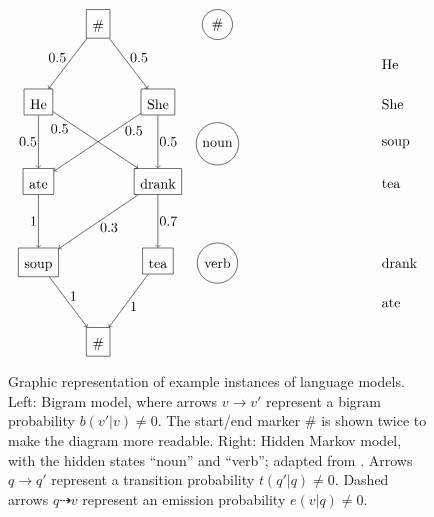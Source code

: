 \begin{figure}[t!]
 \label{fig:language-models}
 \caption{Graphic representation of example instances of language models. Left:
 Bigram model, where arrows $v\to v'$ represent a bigram probability
 $b(v'|v)\neq0$.  The start/end marker $\#$ is shown twice to make the diagram
 more readable. Right: Hidden Markov model, with the hidden states ``noun'' and
 ``verb''; adapted from \cite{nel13}. Arrows $q\to q'$ represent
 a transition probability $t(q'|q)\neq0$. Dashed arrows $q\dashrightarrow v$ represent an
 emission probability $e(v|q)\neq0$.}
 \begin{align*}
  \begin{tikzpicture}[baseline=(current bounding box.north)]
   \begin{scope}[every node/.style={rectangle,draw,text height=1.0em,inner sep=1ex,anchor=north}]
    \node (v0) at (1.5,2) {\#};
    \node (v11) at (0,0) {He};
    \node (v12) at (3,0) {She};
    \node (v21) at (0,-2) {ate};
    \node (v22) at (3,-2) {drank};
    \node (v31) at (0,-4) {soup};
    \node (v32) at (3,-4) {tea};
    \node (v4) at (1.5,-6) {\#};
   \end{scope}
   \begin{scope}[every node/.style={rectangle,inner sep=0.2ex}]
    \draw[->] (v0) -- node[auto,swap] {$0.5$} (v11);
    \draw[->] (v0) -- node[auto] {$0.5$} (v12);
    \draw[->] (v11) -- node[auto,swap] {$0.5$} (v21);
    \draw[->] (v12) -- node[auto,pos=0.2] {$0.5$} (v21);
    \draw[->] (v11) -- node[auto,pos=0.2,swap] {$0.5$} (v22);
    \draw[->] (v12) -- node[auto] {$0.5$} (v22);
    \draw[->] (v21) -- node[auto,swap] {$1$} (v31);
    \draw[->] (v22) -- node[auto] {$0.3$} (v31);
    \draw[->] (v22) -- node[auto] {$0.7$} (v32);
    \draw[->] (v31) -- node[auto] {$1$} (v4);
    \draw[->] (v32) -- node[auto] {$1$} (v4);
   \end{scope}
  \end{tikzpicture}
  &&
  \begin{tikzpicture}[baseline=(current bounding box.north)]
   \begin{scope}[every node/.style={circle,draw}]
    \node (q0) at (0,6) {\#};
    \node (q1) at (0,3) {noun};
    \node (q2) at (0,0) {verb};
   \end{scope}
   \begin{scope}[every node/.style={anchor=west}]
    \node (v11) at (4,5) {He};
    \node (v12) at (4,4) {She};
    \node (v13) at (4,3) {soup};
    \node (v14) at (4,2) {tea};
    \node (v21) at (4,0) {drank};
    \node (v22) at (4,-1) {ate};

\end{scope}
\end{tikzpicture}
\end{align*}
\end{figure}
